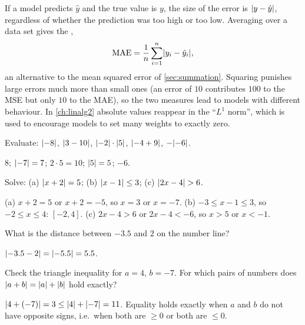 \begin{mlnote}
If a model predicts $\hat y$ and the true value is $y$, the size of the error is
$\lvert y - \hat y\rvert$, regardless of whether the prediction was too high or too
low. Averaging over a data set gives the ,
\[
  \text{MAE} = \frac1n \sum_{i=1}^{n} \lvert y_i - \hat y_i\rvert,
\]
an alternative to the mean squared error of \cref{sec:summation}. Squaring
punishes large errors much more than small ones (an error of $10$ contributes
$100$ to the MSE but only $10$ to the MAE), so the two measures lead to models
with different behaviour. In \cref{ch:linalg2} absolute values reappear in the
``$L^1$ norm'', which is used to encourage models to set many weights to
exactly zero.
\end{mlnote}

\sectionexercises

\begin{exercise}
Evaluate: $\lvert-8\rvert$, $\lvert3 - 10\rvert$, $\lvert-2\rvert\cdot\lvert5\rvert$, $\lvert-4 + 9\rvert$,
$-\lvert-6\rvert$.
\end{exercise}
\begin{solution}
$8$; $\lvert-7\rvert = 7$; $2\cdot5 = 10$; $\lvert5\rvert = 5$; $-6$.
\end{solution}

\begin{exercise}
Solve: (a) $\lvert x+2\rvert = 5$; (b) $\lvert x-1\rvert \le 3$; (c) $\lvert2x - 4\rvert > 6$.
\end{exercise}
\begin{solution}
(a) $x + 2 = 5$ or $x + 2 = -5$, so $x = 3$ or $x = -7$.
(b) $-3 \le x - 1 \le 3$, so $-2 \le x \le 4$: $[-2, 4]$.
(c) $2x - 4 > 6$ or $2x - 4 < -6$, so $x > 5$ or $x < -1$.
\end{solution}

\begin{exercise}
What is the distance between $-3.5$ and $2$ on the number line?
\end{exercise}
\begin{solution}
$\lvert-3.5 - 2\rvert = \lvert-5.5\rvert = 5.5$.
\end{solution}

\begin{exercise}
Check the triangle inequality for $a = 4$, $b = -7$. For which pairs of
numbers does $\lvert a+b\rvert = \lvert a\rvert + \lvert b\rvert$ hold exactly?
\end{exercise}
\begin{solution}
$\lvert4 + (-7)\rvert = 3 \le \lvert4\rvert + \lvert-7\rvert = 11$. Equality holds exactly when
$a$ and $b$ do not have opposite signs, i.e.\ when both are $\ge 0$ or both are
$\le 0$.
\end{solution}

